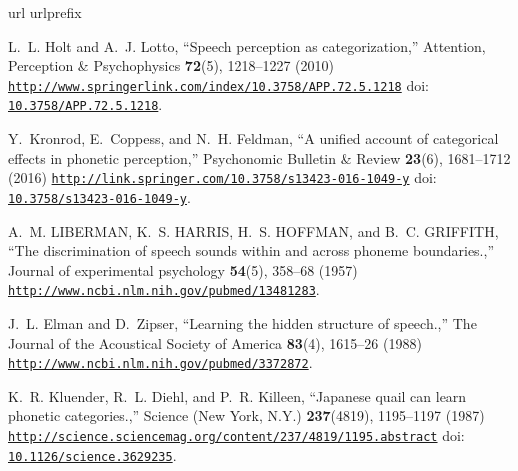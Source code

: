 \begin{thebibliography}{10}
\def\enquote#1,{``#1,''}
\expandafter\ifx\csname url\endcsname\relax
  \def\url#1{\texttt{#1}}\fi
\expandafter\ifx\csname urlprefix\endcsname\relax\def\urlprefix{URL }\fi
\providecommand{\bibinfo}[2]{#2}
\def\plainquote#1{``#1''}
\providecommand{\noopsort}[1]{}
\providecommand{\switchargs}[2]{#2#1}
\providecommand{\dourl}[1]{\href{http://#1}{\nolinkurl{#1}}}
\providecommand{\dodoi}[1]{doi: \href{http://dx.doi.org/#1}{\nolinkurl{#1}}}
  \def\eatspace #1{#1}

\bibinfo{author}{L.~L. Holt} and \bibinfo{author}{A.~J. Lotto},
  \enquote{\bibinfo{title}{{Speech perception as categorization}}},
  \bibinfo{journal}{Attention, Perception {\&} Psychophysics} \textbf{72}(5),
  \bibinfo{pages}{1218--1227} (\bibinfo{year}{2010})
  \dourl{http://www.springerlink.com/index/10.3758/APP.72.5.1218}
  \dodoi{10.3758/APP.72.5.1218}.

\bibinfo{author}{Y.~Kronrod}, \bibinfo{author}{E.~Coppess}, and
  \bibinfo{author}{N.~H. Feldman}, \enquote{\bibinfo{title}{{A unified account
  of categorical effects in phonetic perception}}},
  \bibinfo{journal}{Psychonomic Bulletin {\&} Review} \textbf{23}(6),
  \bibinfo{pages}{1681--1712} (\bibinfo{year}{2016})
  \dourl{http://link.springer.com/10.3758/s13423-016-1049-y}
  \dodoi{10.3758/s13423-016-1049-y}.

\bibinfo{author}{A.~M. LIBERMAN}, \bibinfo{author}{K.~S. HARRIS},
  \bibinfo{author}{H.~S. HOFFMAN}, and \bibinfo{author}{B.~C. GRIFFITH},
  \enquote{\bibinfo{title}{{The discrimination of speech sounds within and
  across phoneme boundaries.}}}, \bibinfo{journal}{Journal of experimental
  psychology} \textbf{54}(5), \bibinfo{pages}{358--68} (\bibinfo{year}{1957})
  \dourl{http://www.ncbi.nlm.nih.gov/pubmed/13481283}.

\bibinfo{author}{J.~L. Elman} and \bibinfo{author}{D.~Zipser},
  \enquote{\bibinfo{title}{{Learning the hidden structure of speech.}}},
  \bibinfo{journal}{The Journal of the Acoustical Society of America}
  \textbf{83}(4), \bibinfo{pages}{1615--26} (\bibinfo{year}{1988})
  \dourl{http://www.ncbi.nlm.nih.gov/pubmed/3372872}.

\bibinfo{author}{K.~R. Kluender}, \bibinfo{author}{R.~L. Diehl}, and
  \bibinfo{author}{P.~R. Killeen}, \enquote{\bibinfo{title}{{Japanese quail can
  learn phonetic categories.}}}, \bibinfo{journal}{Science (New York, N.Y.)}
  \textbf{237}(4819), \bibinfo{pages}{1195--1197} (\bibinfo{year}{1987})
  \dourl{http://science.sciencemag.org/content/237/4819/1195.abstract}
  \dodoi{10.1126/science.3629235}.


\end{thebibliography}
